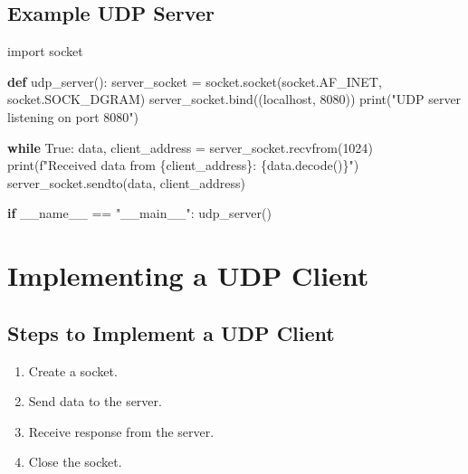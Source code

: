 \documentclass[
  letterpaper,
  DIV=11,
  numbers=noendperiod]{scrreprt}
\newenvironment{Shaded}{\begin{snugshade}}{\end{snugshade}}
\newcommand{\BuiltInTok}[1]{\textcolor[rgb]{0.00,0.23,0.31}{#1}}
\newcommand{\ControlFlowTok}[1]{\textcolor[rgb]{0.00,0.23,0.31}{\textbf{#1}}}
\newcommand{\DecValTok}[1]{\textcolor[rgb]{0.68,0.00,0.00}{#1}}
\newcommand{\ImportTok}[1]{\textcolor[rgb]{0.00,0.46,0.62}{#1}}
\newcommand{\KeywordTok}[1]{\textcolor[rgb]{0.00,0.23,0.31}{\textbf{#1}}}
\newcommand{\NormalTok}[1]{\textcolor[rgb]{0.00,0.23,0.31}{#1}}
\newcommand{\OperatorTok}[1]{\textcolor[rgb]{0.37,0.37,0.37}{#1}}
\newcommand{\SpecialCharTok}[1]{\textcolor[rgb]{0.37,0.37,0.37}{#1}}
\newcommand{\SpecialStringTok}[1]{\textcolor[rgb]{0.13,0.47,0.30}{#1}}
\newcommand{\StringTok}[1]{\textcolor[rgb]{0.13,0.47,0.30}{#1}}
\newcommand{\VariableTok}[1]{\textcolor[rgb]{0.07,0.07,0.07}{#1}}
\providecommand{\tightlist}{%
  \setlength{\itemsep}{0pt}\setlength{\parskip}{0pt}}\usepackage{longtable,booktabs,array}
\begin{document}
\subsection{Example UDP Server}\label{example-udp-server-1}

\begin{Shaded}
\begin{Highlighting}[]
\ImportTok{import}\NormalTok{ socket}

\KeywordTok{def}\NormalTok{ udp\_server():}
\NormalTok{    server\_socket }\OperatorTok{=}\NormalTok{ socket.socket(socket.AF\_INET, socket.SOCK\_DGRAM)}
\NormalTok{    server\_socket.bind((}\StringTok{\textquotesingle{}localhost\textquotesingle{}}\NormalTok{, }\DecValTok{8080}\NormalTok{))}
    \BuiltInTok{print}\NormalTok{(}\StringTok{"UDP server listening on port 8080"}\NormalTok{)}

    \ControlFlowTok{while} \VariableTok{True}\NormalTok{:}
\NormalTok{        data, client\_address }\OperatorTok{=}\NormalTok{ server\_socket.recvfrom(}\DecValTok{1024}\NormalTok{)}
        \BuiltInTok{print}\NormalTok{(}\SpecialStringTok{f"Received data from }\SpecialCharTok{\{}\NormalTok{client\_address}\SpecialCharTok{\}}\SpecialStringTok{: }\SpecialCharTok{\{}\NormalTok{data}\SpecialCharTok{.}\NormalTok{decode()}\SpecialCharTok{\}}\SpecialStringTok{"}\NormalTok{)}
\NormalTok{        server\_socket.sendto(data, client\_address)}

\ControlFlowTok{if} \VariableTok{\_\_name\_\_} \OperatorTok{==} \StringTok{"\_\_main\_\_"}\NormalTok{:}
\NormalTok{    udp\_server()}
\end{Highlighting}
\end{Shaded}

\section{Implementing a UDP Client}\label{implementing-a-udp-client}

\subsection{Steps to Implement a UDP
Client}\label{steps-to-implement-a-udp-client}

\begin{enumerate}
\def\labelenumi{\arabic{enumi}.}
\tightlist
\item
  Create a socket.
\item
  Send data to the server.
\item
  Receive response from the server.
\item
  Close the socket.
\end{enumerate}
\end{document}
